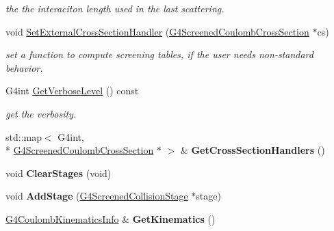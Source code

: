 \begin{DoxyCompactItemize}
\begin{DoxyCompactList}\small\item\em the the interaciton length used in the last scattering. \end{DoxyCompactList}\item 
void \hyperlink{classG4ScreenedNuclearRecoil_aa98210f990a3b80391f6f661c17f09e5}{Set\-External\-Cross\-Section\-Handler} (\hyperlink{classG4ScreenedCoulombCrossSection}{G4\-Screened\-Coulomb\-Cross\-Section} $\ast$cs)
\begin{DoxyCompactList}\small\item\em set a function to compute screening tables, if the user needs non-\/standard behavior. \end{DoxyCompactList}\item 
\hypertarget{classG4ScreenedNuclearRecoil_a1f1eb71aa90e9b9d83b3c2f082f404cb}{G4int \hyperlink{classG4ScreenedNuclearRecoil_a1f1eb71aa90e9b9d83b3c2f082f404cb}{Get\-Verbose\-Level} () const }\label{classG4ScreenedNuclearRecoil_a1f1eb71aa90e9b9d83b3c2f082f404cb}

\begin{DoxyCompactList}\small\item\em get the verbosity. \end{DoxyCompactList}\item 
\hypertarget{classG4ScreenedNuclearRecoil_a35030d3bcb0af6a855d08f76c1a1c86f}{std\-::map$<$ G4int, \\*
\hyperlink{classG4ScreenedCoulombCrossSection}{G4\-Screened\-Coulomb\-Cross\-Section} $\ast$ $>$ \& {\bfseries Get\-Cross\-Section\-Handlers} ()}\label{classG4ScreenedNuclearRecoil_a35030d3bcb0af6a855d08f76c1a1c86f}

\item 
\hypertarget{classG4ScreenedNuclearRecoil_af480fe92eb5a8c80b38db068d4da7eb1}{void {\bfseries Clear\-Stages} (void)}\label{classG4ScreenedNuclearRecoil_af480fe92eb5a8c80b38db068d4da7eb1}

\item 
\hypertarget{classG4ScreenedNuclearRecoil_aa6030349f3853422d0a27a836bfd7ca9}{void {\bfseries Add\-Stage} (\hyperlink{classG4ScreenedCollisionStage}{G4\-Screened\-Collision\-Stage} $\ast$stage)}\label{classG4ScreenedNuclearRecoil_aa6030349f3853422d0a27a836bfd7ca9}

\item 
\hypertarget{classG4ScreenedNuclearRecoil_a3ce5de95a63428383e130859d00ac7fa}{\hyperlink{structG4CoulombKinematicsInfo}{G4\-Coulomb\-Kinematics\-Info} \& {\bfseries Get\-Kinematics} ()}\label{classG4ScreenedNuclearRecoil_a3ce5de95a63428383e130859d00ac7fa}


\end{DoxyCompactItemize}
